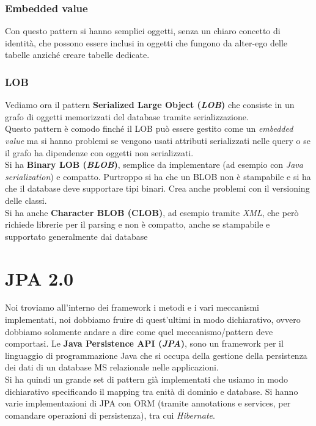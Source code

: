 \subsubsection{Embedded value}
Con questo pattern si hanno semplici oggetti, senza un chiaro concetto di identità, che possono essere inclusi in oggetti che fungono da alter-ego delle tabelle anziché creare tabelle dedicate.

\subsubsection{LOB}
Vediamo ora il pattern \textbf{Serialized Large Object (\textit{LOB})} che consiste in un grafo di oggetti memorizzati del database tramite serializzazione.\\
Questo pattern è comodo finché il LOB può essere gestito come un \textit{embedded value} ma si hanno problemi se vengono usati attributi serializzati nelle query o se il grafo ha dipendenze con oggetti non serializzati.\\ 
Si ha \textbf{Binary LOB (\textit{BLOB})}, semplice da implementare (ad esempio con \textit{Java serialization}) e compatto. Purtroppo si ha che un BLOB non è stampabile e si ha che il database deve supportare tipi binari. Crea anche problemi con il versioning delle classi.\\ 
Si ha anche \textbf{Character BLOB (CLOB)}, ad esempio tramite \textit{XML}, che però richiede librerie per il parsing e non è compatto, anche se stampabile e supportato generalmente dai database

\section{JPA 2.0}
Noi troviamo all'interno dei framework i metodi e i vari meccanismi implementati, noi dobbiamo fruire di quest'ultimi in modo dichiarativo, ovvero dobbiamo solamente andare a dire come quel meccanismo/pattern deve comportasi.
Le \textbf{Java Persistence API (\textit{JPA})}, sono un framework per il linguaggio di programmazione Java che si occupa della gestione della persistenza dei dati di un database MS relazionale nelle applicazioni.\\ 
Si ha quindi un grande set di pattern già implementati che usiamo in modo dichiarativo specificando il mapping tra enità di dominio e database. Si hanno varie implementazioni di JPA con ORM (tramite annotations e services, per comandare operazioni di persistenza), tra cui \textit{Hibernate}.\\

